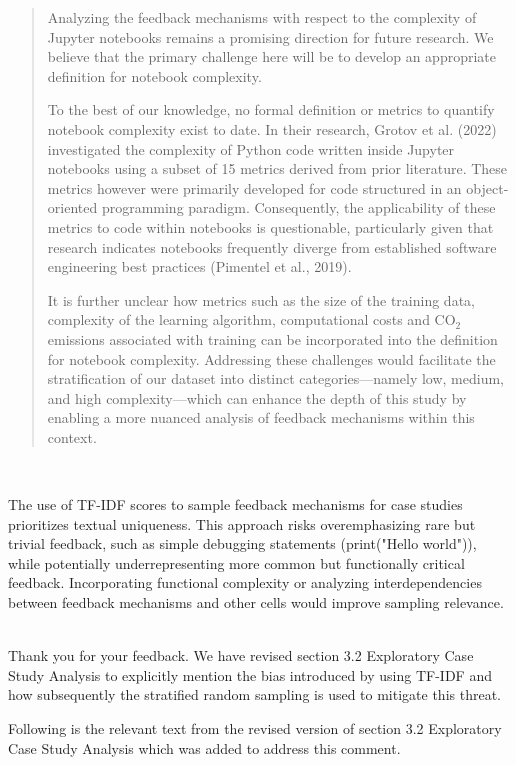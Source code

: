 \documentclass[11pt,fleqn]{article}
\newcommand{\eline}{\vspace*{.75\baselineskip}}
\newcommand{\Referee}[1]{\eline \noindent {\bf Reviewer comment #1:} \\}
\newcommand{\Us}{\eline \noindent {\bf Response:}\\}
\newenvironment{revcomment}[1][]
{\Referee{#1}\begin{rcomment}}
{\end{rcomment}}
\begin{document}
\begin{quote}
  Analyzing the feedback mechanisms with respect to the complexity of Jupyter notebooks remains a promising direction for future research. We believe that the primary challenge here will be to develop an appropriate definition for notebook complexity.

  To the best of our knowledge, no formal definition or metrics to quantify notebook complexity exist to date. In their research, Grotov et al. (2022) investigated the complexity of Python code written inside Jupyter notebooks using a subset of 15 metrics derived from prior literature. These metrics however were primarily developed for code structured in an object-oriented programming paradigm. Consequently, the applicability of these metrics to code within notebooks is questionable, particularly given that research indicates notebooks frequently diverge from established software engineering best practices (Pimentel et al., 2019).

  It is further unclear how metrics such as the size of the training data, complexity of the learning algorithm, computational costs and CO\(_2\) emissions associated with training can be incorporated into the definition for notebook complexity. Addressing these challenges would facilitate the stratification of our dataset into distinct categories---namely low, medium, and high complexity---which can enhance the depth of this study by enabling a more nuanced analysis of feedback mechanisms within this context.

\end{quote}

\begin{revcomment}[2.5]
  The use of TF-IDF scores to sample feedback mechanisms for case studies prioritizes textual uniqueness. This approach risks overemphasizing rare but trivial feedback, such as simple debugging statements (print("Hello world")), while potentially underrepresenting more common but functionally critical feedback. Incorporating functional complexity or analyzing interdependencies between feedback mechanisms and other cells would improve sampling relevance.
\end{revcomment}

\Us Thank you for your feedback. We have revised section 3.2 Exploratory Case Study Analysis to explicitly mention the bias introduced by using TF-IDF and how subsequently the stratified random sampling is used to mitigate this threat.

Following is the relevant text from the revised version of section 3.2 Exploratory Case Study Analysis which was added to address this comment.
\end{document}
